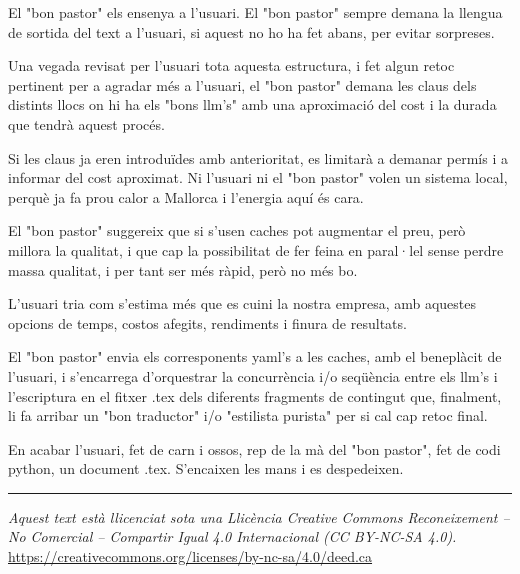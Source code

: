 \documentclass[12pt]{article}
\begin{document}
	El "bon pastor" els ensenya a l'usuari. El "bon pastor" sempre demana la llengua de sortida del text a l'usuari, si aquest no ho ha fet abans, per evitar sorpreses.\\
	
		\medskip
		
	Una vegada revisat per l'usuari tota aquesta estructura, i fet algun retoc pertinent per a agradar més a l'usuari, el "bon pastor" demana les claus dels distints llocs on hi ha els "bons llm's" amb una aproximació del cost i la durada que tendrà aquest procés.
	
	Si les claus ja eren introduïdes amb anterioritat, es limitarà a demanar permís i a informar del cost aproximat. Ni l'usuari ni el "bon pastor" volen un sistema local, perquè ja fa prou calor a Mallorca i l'energia aquí és cara.\\
	
	\medskip
	
	El "bon pastor" suggereix que si s'usen caches pot augmentar el preu, però millora la qualitat, i que cap la possibilitat de fer feina en paral·lel sense perdre massa qualitat, i per tant ser més ràpid, però no més bo.
	
	L'usuari tria com s'estima més que es cuini la nostra empresa, amb aquestes opcions de temps, costos afegits, rendiments i finura de resultats.
	
	El "bon pastor" envia els corresponents yaml's a les caches, amb el beneplàcit de l'usuari, i s'encarrega d'orquestrar la concurrència i/o seqüència entre els llm's i l'escriptura en el fitxer .tex dels diferents fragments de contingut que, finalment, li fa arribar un "bon traductor" i/o "estilista purista" per si cal cap retoc final.\\
	
	\medskip
	
	En acabar l'usuari, fet de carn i ossos, rep de la mà del "bon pastor", fet de codi python, un document .tex. S'encaixen les mans i es despedeixen.
	
	\vspace{1cm}
	
	\noindent\rule{\textwidth}{0.4pt}
	
	\vspace{0.5cm}
	
	\noindent
	\textit{Aquest text està llicenciat sota una Llicència Creative Commons Reconeixement – No Comercial – Compartir Igual 4.0 Internacional (CC BY-NC-SA 4.0).}\\
	\url{https://creativecommons.org/licenses/by-nc-sa/4.0/deed.ca}
\end{document}
